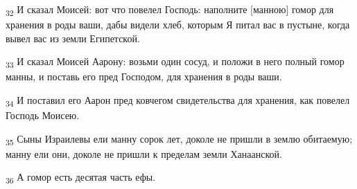 \begin{tcolorbox}
\textsubscript{32} И сказал Моисей: вот что повелел Господь: наполните [манною] гомор для хранения в роды ваши, дабы видели хлеб, которым Я питал вас в пустыне, когда вывел вас из земли Египетской.
\end{tcolorbox}
\begin{tcolorbox}
\textsubscript{33} И сказал Моисей Аарону: возьми один сосуд, и положи в него полный гомор манны, и поставь его пред Господом, для хранения в роды ваши.
\end{tcolorbox}
\begin{tcolorbox}
\textsubscript{34} И поставил его Аарон пред ковчегом свидетельства для хранения, как повелел Господь Моисею.
\end{tcolorbox}
\begin{tcolorbox}
\textsubscript{35} Сыны Израилевы ели манну сорок лет, доколе не пришли в землю обитаемую; манну ели они, доколе не пришли к пределам земли Ханаанской.
\end{tcolorbox}
\begin{tcolorbox}
\textsubscript{36} А гомор есть десятая часть ефы.
\end{tcolorbox}
